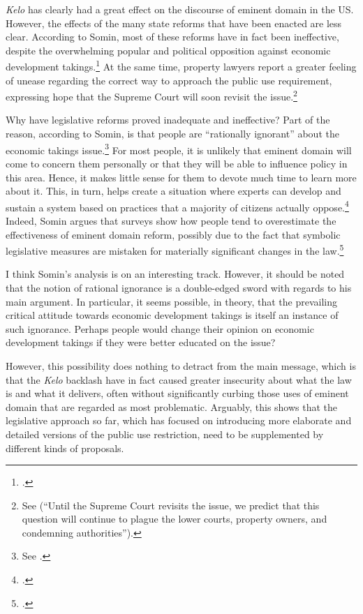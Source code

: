 {\it Kelo} has clearly had a great effect on the discourse of eminent domain in the US. However, the effects of the many state reforms that have been enacted are less clear. According to Somin, most of these reforms have in fact been ineffective, despite the overwhelming popular and political opposition against economic development takings.\footcite[2170-2171]{somin09} At the same time, property lawyers report a greater feeling of unease regarding the correct way to approach the public use requirement, expressing hope that the Supreme Court will soon revisit the issue.\footnote{See \cite{murakami13} (``Until the Supreme Court revisits the issue, we predict that this question will continue to plague the lower courts, property owners, and condemning authorities'').} 

Why have legislative reforms proved inadequate and ineffective? Part of the reason, according to Somin, is that people are ``rationally ignorant'' about the economic takings issue.\footnote{See \cite[2170]{somin09}.} For most people, it is unlikely that eminent domain will come to concern them personally or that they will be able to influence policy in this area. Hence, it makes little sense for them to devote much time to learn more about it. This, in turn, helps create a situation where experts can develop and sustain a system based on practices that a majority of citizens actually oppose.\footcite[2163-2171]{somin09} Indeed, Somin argues that surveys show how people tend to overestimate the effectiveness of eminent domain reform, possibly due to the fact that symbolic legislative measures are mistaken for materially significant changes in the law.\footcite[2155-2157]{somin09}

I think Somin's analysis is on an interesting track. However, it should be noted that the notion of rational ignorance is a double-edged sword with regards to his main argument. In particular, it seems possible, in theory, that the prevailing critical attitude towards economic development takings is itself an instance of such ignorance. Perhaps people would change their opinion on economic development takings if they were better educated on the issue?

However, this possibility does nothing to detract from the main message, which is that the {\it Kelo} backlash have in fact caused greater insecurity about what the law is and what it delivers, often without significantly curbing those uses of eminent domain that are regarded as most problematic. Arguably, this shows that the legislative approach so far, which has focused on introducing more elaborate and detailed versions of the public use restriction, need to be supplemented by different kinds of proposals. 

